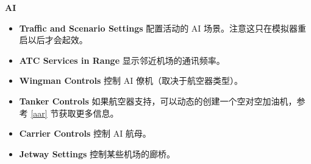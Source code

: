 \ifchinese
\item \textbf{AI}
 \begin{itemize}
  \item \textbf{Traffic and Scenario Settings} 配置活动的 AI 场景。注意这只在模拟器重启以后才会起效。
   \item \textbf{ATC Services in Range} 显示邻近机场的通讯频率。
   \item \textbf{Wingman Controls} 控制 AI 僚机（取决于航空器类型）。
    \item \textbf{Tanker Controls} 如果航空器支持，可以动态的创建一个空对空加油机，参考 \ref{aar} 节获取更多信息。
    \item \textbf{Carrier Controls} 控制 AI 航母。
    \item \textbf{Jetway Settings} 控制某些机场的廊桥。
 \end{itemize}
\fi

{}


